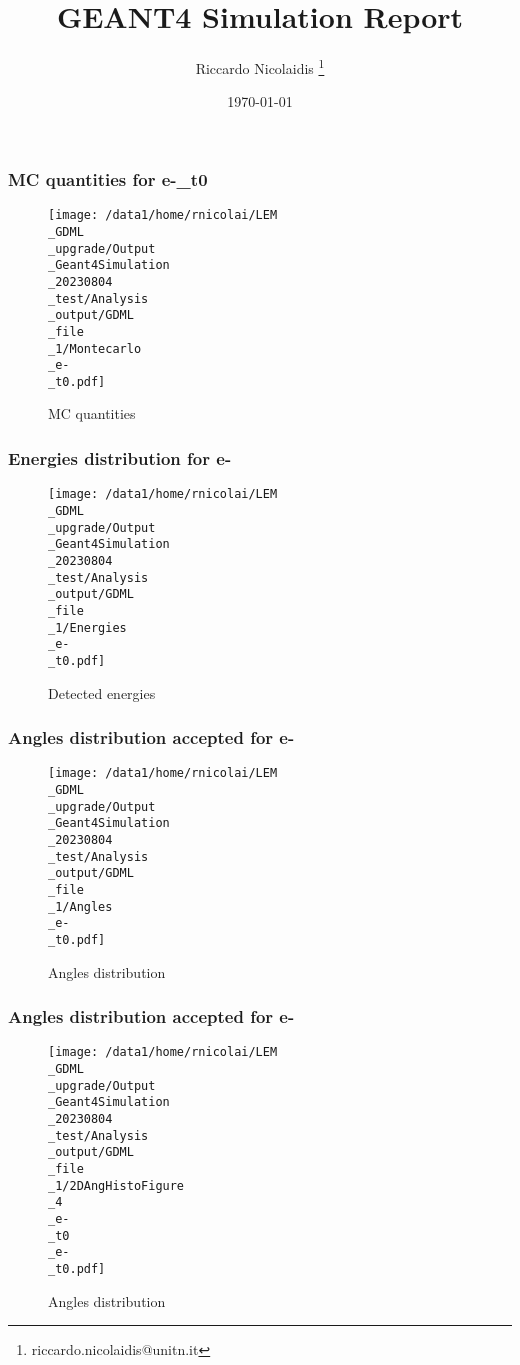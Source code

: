 \documentclass[8pt]{beamer}
\title{GEANT4 Simulation Report}
\author{Riccardo Nicolaidis \footnote{riccardo.nicolaidis@unitn.it}}
\date{\today}
\begin{document}
        
            \begin{frame}
                \titlepage
            \end{frame}
            
            \begin{frame}
                \frametitle{MC quantities for e-\_t0}
            
        \begin{figure}[h]
            \centering
            \texttt{[image: /data1/home/rnicolai/LEM\\\_GDML\\\_upgrade/Output\\\_Geant4Simulation\\\_20230804\\\_test/Analysis\\\_output/GDML\\\_file\\\_1/Montecarlo\\\_e-\\\_t0.pdf]}
            \caption{MC quantities}
        \end{figure}
        
            \end{frame}
            
            \begin{frame}
                \frametitle{Energies distribution for e-}
            
        \begin{figure}[h]
            \centering
            \texttt{[image: /data1/home/rnicolai/LEM\\\_GDML\\\_upgrade/Output\\\_Geant4Simulation\\\_20230804\\\_test/Analysis\\\_output/GDML\\\_file\\\_1/Energies\\\_e-\\\_t0.pdf]}
            \caption{Detected energies}
        \end{figure}
        
            \end{frame}
            
            \begin{frame}
                \frametitle{Angles distribution accepted for e-}
            
        \begin{figure}[h]
            \centering
            \texttt{[image: /data1/home/rnicolai/LEM\\\_GDML\\\_upgrade/Output\\\_Geant4Simulation\\\_20230804\\\_test/Analysis\\\_output/GDML\\\_file\\\_1/Angles\\\_e-\\\_t0.pdf]}
            \caption{Angles distribution}
        \end{figure}
        
            \end{frame}
            
            \begin{frame}
                \frametitle{Angles distribution accepted for e-}
            
        \begin{figure}[h]
            \centering
            \texttt{[image: /data1/home/rnicolai/LEM\\\_GDML\\\_upgrade/Output\\\_Geant4Simulation\\\_20230804\\\_test/Analysis\\\_output/GDML\\\_file\\\_1/2DAngHistoFigure\\\_4\\\_e-\\\_t0\\\_e-\\\_t0.pdf]}
            \caption{Angles distribution}
        \end{figure}
        
            \end{frame}
            
\end{document}

